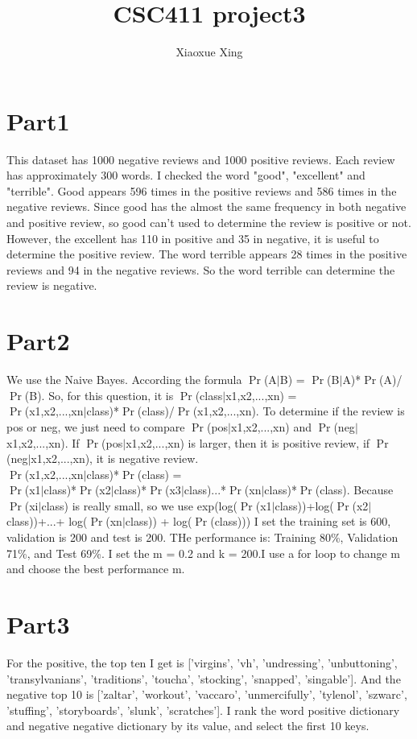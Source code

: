 \documentclass{article}
\begin{document}
\title{CSC411 project3}
\author{Xiaoxue Xing\\}

\maketitle
\section{Part1}
This dataset has 1000 negative reviews and 1000 positive reviews. Each review has approximately 300 words. I checked the word "good", "excellent" and "terrible". Good appears 596 times in the positive reviews and 586 times in the negative reviews. Since good has the almost the same frequency in both negative and positive review, so good can't used to determine the review is positive or not. However, the excellent has 110 in positive and 35 in negative, it is useful to determine the positive review. The word terrible appears 28 times in the positive reviews and 94 in the negative reviews. So the word terrible can determine the review is negative. 

\section{Part2}
We use the Naive Bayes. According the formula $\Pr$(A$\mid$B) = $\Pr$(B$\mid$A)*$\Pr$(A)/$\Pr$(B). So, for this question, it is $\Pr$(class$\mid$x1,x2,...,xn) =\\ $\Pr$(x1,x2,...,xn$\mid$class)*$\Pr$(class)/$\Pr$(x1,x2,...,xn). To determine if the review is pos or neg, we just need to compare $\Pr$(pos$\mid$x1,x2,...,xn) and $\Pr$(neg$\mid$x1,x2,...,xn). If $\Pr$(pos$\mid$x1,x2,...,xn) is larger, then it is positive review, if $\Pr$(neg$\mid$x1,x2,...,xn), it is negative review.\\
$\Pr$(x1,x2,...,xn$\mid$class)*$\Pr$(class) =\\ $\Pr$(x1$\mid$class)*$\Pr$(x2$\mid$class)*$\Pr$(x3$\mid$class)...*$\Pr$(xn$\mid$class)*$\Pr$(class). Because $\Pr$(xi$\mid$class) is really small, so we use exp(log($\Pr$(x1$\mid$class))+log($\Pr$(x2$\mid$class))+...+ log($\Pr$(xn$\mid$class)) + log($\Pr$(class)))
I set the training set is 600, validation is 200 and test is 200. THe performance is: Training 80\%, Validation 71\%, and Test 69\%. I set the m = 0.2 and k = 200.I use a for loop to change m and choose the best performance m.
\section{Part3}
For the positive, the top ten I get is ['virgins', 'vh', 'undressing', 'unbuttoning', 'transylvanians', 'traditions', 'toucha', 'stocking', 'snapped', 'singable']. And the negative top 10 is ['zaltar', 'workout', 'vaccaro', 'unmercifully', 'tylenol', 'szwarc', 'stuffing', 'storyboards', 'slunk', 'scratches']. I rank the word positive dictionary and negative negative dictionary by its value, and select the first 10 keys.
\end{document}

